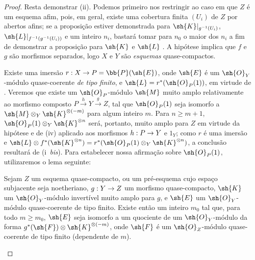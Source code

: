 \documentclass[oneside,10pt]{amsart}
\makeatletter
\renewcommand{\geq}{\geqslant}
\newcommand{\ega@arrow}[2]{\mathchoice{#1}{#2}{#2}{#2}}
\renewcommand{\to}{\ega@arrow{\longrightarrow}{\rightarrow}}
\let\EGAOriginalLabel\label
\renewcommand{\label}[1]{\phantomsection\EGAOriginalLabel{#1}}
\makeatother
\begin{document}
\begin{proof}
Resta demonstrar (ii).
Podemos primeiro nos restringir ao caso em que $Z$ é um esquema afim, pois, em geral, existe uma cobertura finita $(U_i)$ de $Z$ por abertos afins;
se a proposição estiver demonstrada para $\sh{K}|_{g^{-1}(U_i)}$, $\sh{L}|_{f^{-1}(g^{-1}(U_i))}$ e um inteiro $n_i$, bastará tomar para $n_0$ o maior dos $n_i$ a fim de demonstrar a proposição para $\sh{K}$ e $\sh{L}$ .
A hipótese implica que $f$ e $g$ são morfismos separados, logo $X$ e $Y$ são \emph{esquemas} quase-compactos.

Existe uma imersão $r:X\to P=\bb{P}(\sh{E})$, onde $\sh{E}$ é um $\sh{O}_Y$-módulo quase-coerente \emph{de tipo finito}, e $\sh{L}=r^*(\sh{O}_P(1))$, em virtude de .
Veremos que existe um $\sh{O}_P$-módulo $\sh{M}$ muito amplo relativamente ao morfismo composto $P\xrightarrow{h}Y\xrightarrow{g}Z$, tal que $\sh{O}_P(1)$ seja isomorfo a $\sh{M}\otimes_Y\sh{K}^{\otimes(-m)}$ para algum inteiro $m$.
Para $n\geq m+1$, $\sh{O}_P(1)\otimes_Y\sh{K}^{\otimes n}$ será, portanto, muito amplo para $Z$ em virtude da hipótese e de (iv) aplicado aos morfismos $h:P\to Y$ e $1_Y$;
como $r$ é uma imersão e $\sh{L}\otimes f^*(\sh{K}^{\otimes n})=r^*(\sh{O}_P(1)\otimes_Y\sh{K}^{\otimes n})$, a conclusão resultará de (i~\emph{bis}).
Para estabelecer nossa afirmação sobre $\sh{O}_P(1)$, utilizaremos o lema seguinte:

\begin{lemma}[4.4.10.1]
\label{II.4.4.10.1}
Sejam $Z$ um esquema quase-compacto, ou um pré-esquema cujo espaço subjacente seja noetheriano, $g:Y\to Z$ um morfismo quase-compacto, $\sh{K}$ um $\sh{O}_Y$-módulo invertível muito amplo para $g$, e $\sh{E}$ um $\sh{O}_Y$-módulo quase-coerente de tipo finito.
Existe então um inteiro $m_0$ tal que, para todo $m\geq m_0$, $\sh{E}$ seja isomorfo a um quociente de um $\sh{O}_Y$-módulo da forma $g^*(\sh{F})\otimes\sh{K}^{\otimes(-m)}$, onde $\sh{F}$ é um $\sh{O}_Z$-módulo quase-coerente de tipo finito (dependente de $m$).
\end{lemma}


\end{proof}
\end{document}
